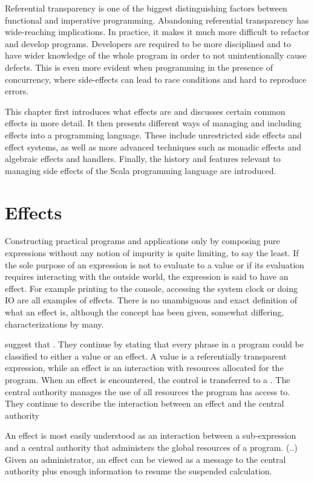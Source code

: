 Referential transparency is one of the biggest distinguishing factors between functional and imperative programming. Abandoning referential transparency has wide-reaching implications. In practice, it makes it much more difficult to refactor and develop programs. Developers are required to be more disciplined and to have wider knowledge of the whole program in order to not unintentionally cause defects. This is even more evident when programming in the presence of concurrency, where side-effects can lead to race conditions and hard to reproduce errors.~\cite[Chapter~3]{sicp}

This chapter first introduces what effects are and discusses certain common effects in more detail. It then presents different ways of managing and including effects into a programming language. These include unrestricted side effects and effect systems, as well as more advanced techniques such as monadic effects and algebraic effects and handlers. Finally, the history and features relevant to managing side effects of the Scala programming language are introduced.


\section{Effects} \label{effects}
Constructing practical programs and applications only by composing pure expressions without any notion of impurity is quite limiting, to say the least. If the sole purpose of an expression is not to evaluate to a value or if its evaluation requires interacting with the outside world, the expression is said to have an effect. For example printing to the console, accessing the system clock or doing IO are all examples of effects. There is no unambiguous and exact definition of what an effect is, although the concept has been given, somewhat differing, characterizations by many.

\textcite{den-lang-specs} suggest that . They continue by stating that every phrase in a program could be classified to either a value or an effect. A value is a referentially transparent expression, while an effect is an interaction with resources allocated for the program. When an effect is encountered, the control is transferred to a . The central authority manages the use of all resources the program has access to. They continue to describe the interaction between an effect and the central authority
\begin{displayquote}
An effect is most easily understood as an interaction between a sub-expression
and a central authority that administers the global resources of a program. (..) Given an administrator, an effect can be viewed as a message to the central authority plus enough information to resume the suspended calculation.
\end{displayquote}

